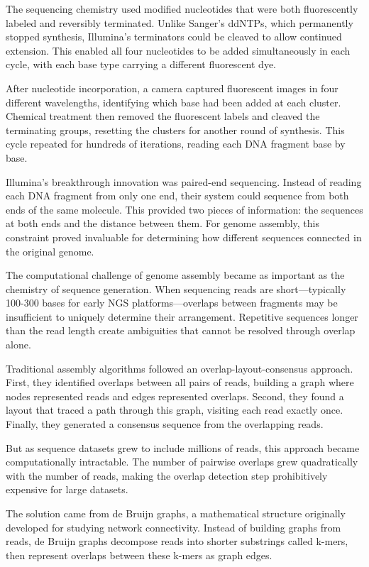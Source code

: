 The sequencing chemistry used modified nucleotides that were both fluorescently labeled and reversibly terminated. Unlike Sanger's ddNTPs, which permanently stopped synthesis, Illumina's terminators could be cleaved to allow continued extension. This enabled all four nucleotides to be added simultaneously in each cycle, with each base type carrying a different fluorescent dye.

After nucleotide incorporation, a camera captured fluorescent images in four different wavelengths, identifying which base had been added at each cluster. Chemical treatment then removed the fluorescent labels and cleaved the terminating groups, resetting the clusters for another round of synthesis. This cycle repeated for hundreds of iterations, reading each DNA fragment base by base.

Illumina's breakthrough innovation was paired-end sequencing. Instead of reading each DNA fragment from only one end, their system could sequence from both ends of the same molecule. This provided two pieces of information: the sequences at both ends and the distance between them. For genome assembly, this constraint proved invaluable for determining how different sequences connected in the original genome.

The computational challenge of genome assembly became as important as the chemistry of sequence generation. When sequencing reads are short—typically 100-300 bases for early NGS platforms—overlaps between fragments may be insufficient to uniquely determine their arrangement. Repetitive sequences longer than the read length create ambiguities that cannot be resolved through overlap alone.

Traditional assembly algorithms followed an overlap-layout-consensus approach. First, they identified overlaps between all pairs of reads, building a graph where nodes represented reads and edges represented overlaps. Second, they found a layout that traced a path through this graph, visiting each read exactly once. Finally, they generated a consensus sequence from the overlapping reads.

But as sequence datasets grew to include millions of reads, this approach became computationally intractable. The number of pairwise overlaps grew quadratically with the number of reads, making the overlap detection step prohibitively expensive for large datasets.

The solution came from de Bruijn graphs, a mathematical structure originally developed for studying network connectivity. Instead of building graphs from reads, de Bruijn graphs decompose reads into shorter substrings called k-mers, then represent overlaps between these k-mers as graph edges.

